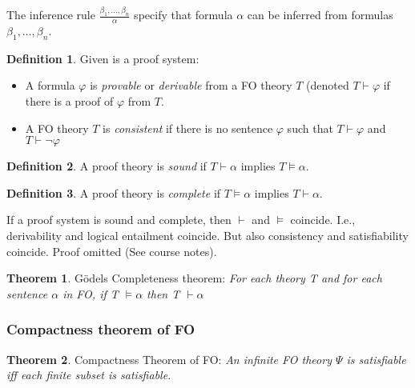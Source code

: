 \documentclass[10pt,a4paper]{article}
\theoremstyle{definition}
\newtheorem{definition}{Definition}[section]
\newtheorem{theorem}{Theorem}
\begin{document}
The inference rule $\frac{\beta_1, \dots,\beta_n}{\alpha}$ specify that formula $\alpha$ can be inferred from formulas $\beta_1, \dots,\beta_n$.

\begin{definition}
Given is a proof system:

\begin{itemize}
	\item A formula $\varphi$ is \textit{provable} or \textit{derivable} from a FO theory $T$ (denoted $T \vdash \varphi$ if there is a proof of $\varphi$ from $T$.
	\item A FO theory $T$ is \textit{consistent} if there is no sentence $\varphi$ such that $T \vdash \varphi$ and $T \vdash \lnot\varphi$
\end{itemize}
\end{definition}

\begin{definition}
A proof theory is \textit{sound} if $T \vdash \alpha$ implies $T \models \alpha$.
\end{definition}

\begin{definition}
A proof theory is \textit{complete} if $T \models \alpha$ implies $T \vdash \alpha$.
\end{definition}

If a proof system is sound and complete, then $\vdash$ and $\models$ coincide. I.e., derivability and logical entailment coincide. But also consistency and satisfiability coincide. Proof omitted (See course notes).

\begin{theorem}
G\"{o}dels Completeness theorem: \textit{For each theory T and for each sentence $\alpha$ in FO, if T $\models \alpha$ then T $\vdash \alpha$}
\end{theorem}


\subsubsection{Compactness theorem of FO}

\begin{theorem}
Compactness Theorem of FO: \textit{An infinite FO theory $\Psi$ is satisfiable iff each finite subset is satisfiable.}
\end{theorem}
\end{document}
